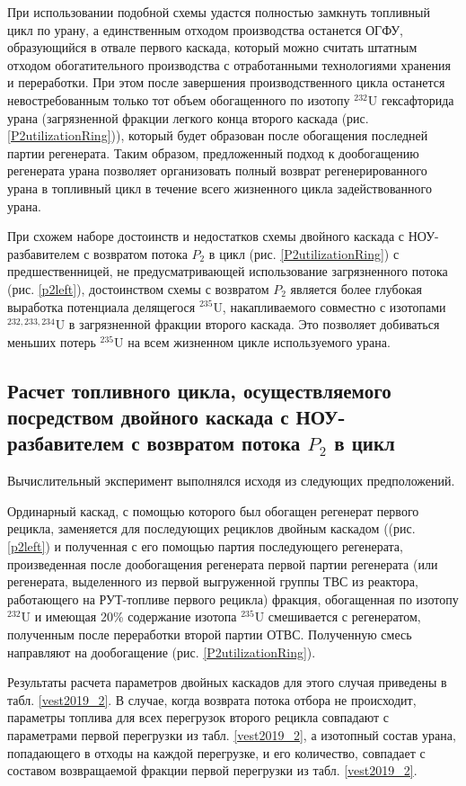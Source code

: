 При использовании подобной схемы удастся полностью замкнуть топливный цикл по урану, а единственным отходом производства останется ОГФУ, образующийся в отвале первого каскада, который можно считать штатным отходом обогатительного производства с отработанными технологиями хранения и переработки. При этом после завершения производственного цикла останется невостребованным только тот объем обогащенного по изотопу $^{232}$U гексафторида урана (загрязненной фракции легкого конца второго каскада (рис. \ref{P2utilizationRing})), который будет образован после обогащения последней партии регенерата. Таким образом, предложенный подход к дообогащению регенерата урана позволяет организовать полный возврат регенерированного урана в топливный цикл в течение всего жизненного цикла задействованного урана.

При схожем наборе достоинств и недостатков схемы двойного каскада с НОУ-разбавителем с возвратом потока $P_2$ в цикл (рис. \ref{P2utilizationRing}) с предшественницей, не предусматривающей использование загрязненного потока (рис. \ref{p2left}), достоинством схемы с возвратом $P_2$ является более глубокая выработка потенциала делящегося $^{235}$U, накапливаемого совместно с изотопами $^{232,233,234}$U в загрязненной фракции второго каскада. Это позволяет добиваться меньших потерь $^{235}$U на всем жизненном цикле используемого урана.

\subsection{Расчет топливного цикла, осуществляемого посредством двойного каскада с НОУ-разбавителем с возвратом потока $P_2$ в цикл}

Вычислительный эксперимент выполнялся исходя из следующих предположений.

Ординарный каскад, с помощью которого был обогащен регенерат первого рецикла, заменяется для последующих рециклов двойным каскадом ((рис. \ref{p2left}) и  полученная с его помощью партия последующего регенерата, произведенная после дообогащения регенерата первой партии регенерата (или регенерата, выделенного из первой выгруженной группы ТВС из реактора, работающего на РУТ-топливе первого рецикла) фракция, обогащенная по изотопу $^{232}$U и имеющая 20\% содержание изотопа $^{235}$U смешивается с регенератом, полученным после переработки второй партии ОТВС. Полученную смесь направляют на дообогащение (рис. \ref{P2utilizationRing}).


Результаты расчета параметров двойных каскадов для этого случая приведены в табл. \ref{vest2019_2}. В случае, когда возврата потока отбора не происходит, параметры топлива для всех перегрузок второго рецикла совпадают с параметрами первой перегрузки из табл. \ref{vest2019_2}, а изотопный состав урана, попадающего в отходы на каждой перегрузке, и его количество, совпадает с составом возвращаемой фракции первой перегрузки из табл. \ref{vest2019_2}.

